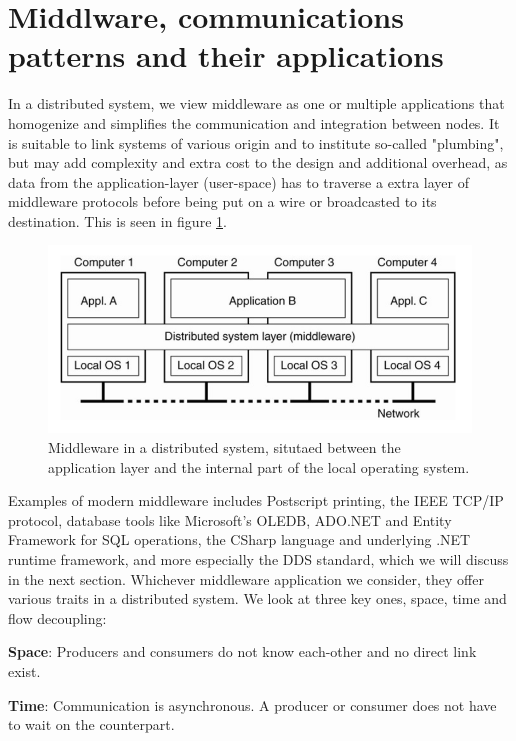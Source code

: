 \section{Middlware, communications patterns and their applications}

In a distributed system, we view middleware as one or multiple applications that homogenize and simplifies the communication and integration between nodes. It is suitable to link systems of various origin and to institute so-called "plumbing", but may add complexity and extra cost to the design and additional overhead, as data from the application-layer (user-space) has to traverse a extra layer of middleware protocols before being put on a wire or broadcasted to its destination. This is seen in figure \ref{fig:middleware}. 

\begin{figure}[h!]\label{}
	\centering
	\includegraphics[scale=0.5]{middleware/middlewaredist.png}
	\caption{Middleware in a distributed system, situtaed between the application layer and the internal part of the local operating system.}
	\label{fig:middleware}
\end{figure}

Examples of modern middleware includes Postscript printing, the IEEE TCP/IP protocol, database tools like Microsoft's OLEDB, ADO.NET and Entity Framework for SQL operations, the CSharp language and underlying .NET runtime framework, and more especially the DDS standard, which we will discuss in the next section. Whichever middleware application we consider, they offer various traits in a distributed system. We look at three key ones, space, time and flow decoupling:

\textbf{Space}: Producers and consumers do not know each-other and no direct link exist.

\textbf{Time}: Communication is asynchronous. A producer or consumer does not have to wait on the counterpart.

